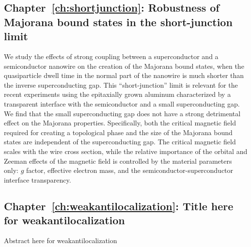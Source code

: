 \subsection{Chapter~\ref{ch:shortjunction}: Robustness of Majorana bound states in the short-junction limit}
We study the effects of strong coupling between a superconductor and a semiconductor nanowire on the creation of the Majorana bound states, when the quasiparticle dwell time in the normal part of the nanowire is much shorter than the inverse superconducting gap.
This ``short-junction'' limit is relevant for the recent experiments using the epitaxially grown aluminum characterized by a transparent interface with the semiconductor and a small superconducting gap.
We find that the small superconducting gap does not have a strong detrimental effect on the Majorana properties.
Specifically, both the critical magnetic field required for creating a topological phase and the size of the Majorana bound states are independent of the superconducting gap.
The critical magnetic field scales with the wire cross section, while the relative importance of the orbital and Zeeman effects of the magnetic field is controlled by the material parameters only: $g$ factor, effective electron mass, and the semiconductor-superconductor interface transparency.

\subsection{Chapter~\ref{ch:weakantilocalization}: Title here for weakantilocalization}
Abstract here for weakantilocalization
\vspace{1mm}


